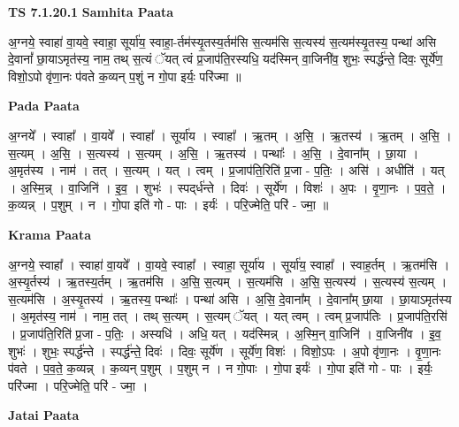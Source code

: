 \documentclass[17pt]{extarticle}
\begin{document}
\textbf{TS 7.1.20.1 } \newline
\textbf{Samhita Paata} \newline

अ॒ग्नये॒ स्वाहा॑ वा॒यवे॒ स्वाहा॒ सूर्या॑य॒ स्वाहा॒-र्तम॑स्यृ॒तस्य॒र्तम॑सि स॒त्यम॑सि स॒त्यस्य॑ स॒त्यम॑स्यृ॒तस्य॒ पन्था॑ असि दे॒वानां᳚ छा॒याऽमृत॑स्य॒ नाम॒ तथ् स॒त्यं ॅयत् त्वं प्र॒जाप॑ति॒रस्यधि॒ यद॑स्मिन् वा॒जिनी॑व॒ शुभः॒ स्पर्द्ध॑न्ते॒ दिवः॒ सूर्ये॑ण॒ विशो॒ऽपो वृ॑णा॒नः प॑वते क॒व्यन् प॒शुं न गो॒पा इर्यः॒ परि॑ज्मा ॥ \newline

\textbf{Pada Paata} \newline

अ॒ग्नये᳚ । स्वाहा᳚ । वा॒यवे᳚ । स्वाहा᳚ । सूर्या॑य । स्वाहा᳚ । ऋ॒तम् । अ॒सि॒ । ऋ॒तस्य॑ । ऋ॒तम् । अ॒सि॒ । स॒त्यम् । अ॒सि॒ । स॒त्यस्य॑ । स॒त्यम् । अ॒सि॒ । ऋ॒तस्य॑ । पन्थाः᳚ । अ॒सि॒ । दे॒वाना᳚म् । छा॒या । अ॒मृत॑स्य । नाम॑ । तत् । स॒त्यम् । यत् । त्वम् । प्र॒जाप॑ति॒रिति॑ प्र॒जा - प॒तिः॒ । असि॑ । अधीति॑ । यत् । अ॒स्मि॒न्न् । वा॒जिनि॑ । इ॒व॒ । शुभः॑ । स्पद्‌र्ध॑न्ते । दिवः॑ । सूर्ये॑ण । विशः॑ । अ॒पः । वृ॒णा॒नः । प॒व॒ते॒ । क॒व्यन्न् । प॒शुम् । न । गो॒पा इति॑ गो - पाः । इर्यः॑ । परि॒ज्मेति॒ परि॑ - ज्मा॒ ॥  \newline


\textbf{Krama Paata} \newline

अ॒ग्नये॒ स्वाहा᳚ । स्वाहा॑ वा॒यवे᳚ । वा॒यवे॒ स्वाहा᳚ । स्वाहा॒ सूर्या॑य । सूर्या॑य॒ स्वाहा᳚ । स्वाह॒र्तम् । ऋ॒तम॑सि । अ॒स्यृ॒र्तस्य॑ । ऋ॒तस्य॒र्तम् । ऋ॒तम॑सि । अ॒सि॒ स॒त्यम् । स॒त्यम॑सि । अ॒सि॒ स॒त्यस्य॑ । स॒त्यस्य॑ स॒त्यम् । स॒त्यम॑सि । अ॒स्यृ॒तस्य॑ । ऋ॒तस्य॒ पन्थाः᳚ । पन्था॑ असि । अ॒सि॒ दे॒वाना᳚म् । दे॒वाना᳚म् छा॒या । छा॒याऽमृत॑स्य । अ॒मृत॑स्य॒ नाम॑ । नाम॒ तत् । तथ् स॒त्यम् । स॒त्यम् ॅयत् । यत् त्वम् । त्वम् प्र॒जाप॑तिः । प्र॒जाप॑ति॒रसि॑ । प्र॒जाप॑ति॒रिति॑ प्र॒जा - प॒तिः॒ । अस्यधि॑ । अधि॒ यत् । यद॑स्मिन्न् । अ॒स्मि॒न् वा॒जिनि॑ । वा॒जिनी॑व । इ॒व॒ शुभः॑ । शुभः॒ स्पर्द्ध॑न्ते । स्पर्द्ध॑न्ते॒ दिवः॑ । दिवः॒ सूर्ये॑ण । सूर्ये॑ण॒ विशः॑ । विशो॒ऽपः । अ॒पो वृ॑णा॒नः । वृ॒णा॒नः प॑वते । प॒व॒ते॒ क॒व्यन्न् । क॒व्यन् प॒शुम् । प॒शुम् न । न गो॒पाः । गो॒पा इर्यः॑ । गो॒पा इति॑ गो - पाः । इर्यः॒ परि॑ज्मा । परि॒ज्मेति॒ परि॑ - ज्मा॒ । \newline

\textbf{Jatai Paata} \newline
\end{document}
